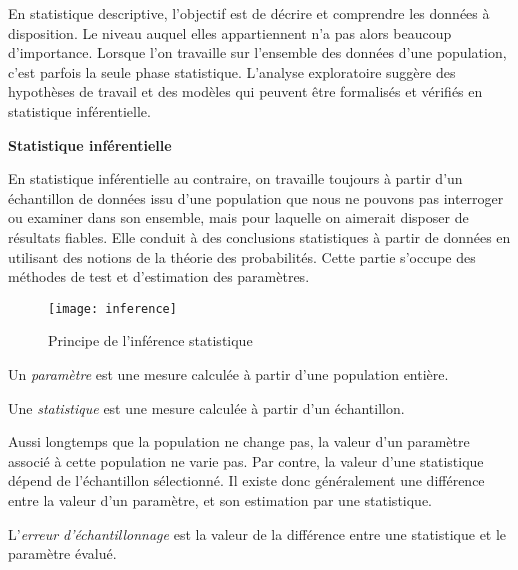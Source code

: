 En statistique descriptive, l'objectif est de d\'ecrire et comprendre les donn\'ees \`a disposition. Le niveau auquel elles appartiennent n'a pas alors beaucoup d'importance. Lorsque l'on travaille sur l'ensemble des donn\'ees d'une population, c'est parfois la seule phase statistique. L'analyse exploratoire sugg\`ere des hypoth\`eses de travail et des mod\`eles qui peuvent \^{e}tre formalis\'es et v\'erifi\'es en
statistique inf\'erentielle.

 \vspace*{2ex}

{\bfseries \large Statistique inf\'erentielle}

En statistique inf\'erentielle au contraire, on travaille toujours \`a partir d'un \'echantillon de donn\'ees issu d'une population que nous ne pouvons pas interroger ou examiner dans son ensemble, mais pour laquelle on aimerait disposer de r\'esultats fiables. Elle conduit \`a des conclusions statistiques \`a partir de donn\'ees en utilisant des notions de la th\'eorie des probabilit\'es. Cette partie s'occupe des m\'ethodes de test et d'estimation des param\`etres.

\begin{figure}[hbt]
\centerline{\texttt{[image: inference]}}
\caption{Principe de l'inf\'erence statistique}
\end{figure}

\begin{defi}
Un \emph{param\`etre} est une mesure calcul\'ee \`a partir d'une population enti\`ere.
\end{defi}

\begin{defi}
Une \emph{statistique} est une mesure calcul\'ee \`a partir d'un \'echantillon.
\end{defi}

Aussi longtemps que la population ne change pas, la valeur d'un param\`etre associ\'e \`a cette population ne varie pas. Par contre, la valeur d'une statistique d\'epend de l'\'echantillon s\'electionn\'e. Il existe donc g\'en\'eralement une diff\'erence entre la valeur d'un param\`etre, et son estimation par une statistique.

\begin{defi}
L'\emph{erreur d'\'echantillonnage} est la valeur de la diff\'erence entre une statistique et le param\`etre \'evalu\'e.
\end{defi}


